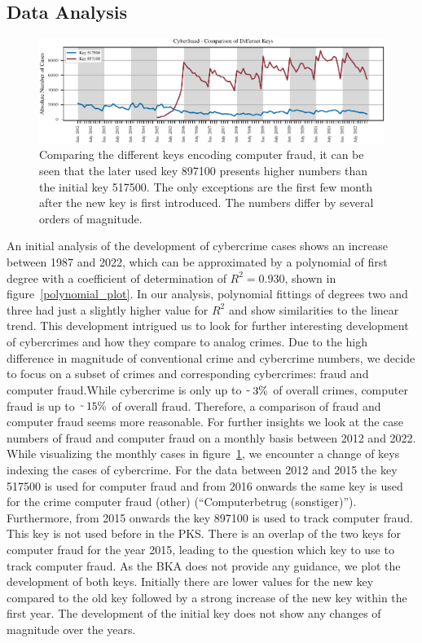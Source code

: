 \documentclass{article}
\theoremstyle{plain}
\theoremstyle{definition}
\theoremstyle{remark}
\begin{document}
\subsection{Data Analysis}
\label{temp_data_analysis}
%
\begin{figure}[btp]
    \includegraphics{fig/computer_fraud_from_diff_keys.pdf}
    \caption{Comparing the different keys encoding computer fraud, it can be seen that the later used key 897100 presents higher numbers than the initial key 517500. The only exceptions are the first few month after the new key is first introduced. The numbers differ by several orders of magnitude.}
    \label{fraud_plot}
\end{figure}
%
An initial analysis of the development of cybercrime cases shows an increase between 1987 and 2022, which can be approximated by a polynomial of first degree with a coefficient of determination of $R^2 = 0.930$, shown in figure~\ref{polynomial_plot}. In our analysis, polynomial fittings of degrees two and three had just a slightly higher value for $R^2$ and show similarities to the linear trend. This development intrigued us to look for further interesting development of cybercrimes and how they compare to analog crimes. Due to the high difference in magnitude of conventional crime and cybercrime numbers, we decide to focus on a subset of crimes and corresponding cybercrimes: fraud and computer fraud.While cybercrime is only up to $\raisebox{-0.7ex}{\~{}}\, 3\%$ of overall crimes, computer fraud is up to $\raisebox{-0.6ex}{\~{}}\, 15\%$ of overall fraud. Therefore, a comparison of fraud and computer fraud seems more reasonable. For further insights we look at the case numbers of fraud and computer fraud on a monthly basis between 2012 and 2022.\\
While visualizing the monthly cases in figure~\ref{fraud_plot}, we encounter a change of keys indexing the cases of cybercrime. For the data between 2012 and 2015 the key 517500 is used for computer fraud and from 2016 onwards the same key is used for the crime computer fraud (other) (\textquotedblleft{}Computerbetrug (sonstiger)\textquotedblright{}). Furthermore, from 2015 onwards the key 897100 is used to track computer fraud. This key is not used before in the PKS. There is an overlap of the two keys for computer fraud for the year 2015, leading to the question which key to use to track computer fraud. As the BKA does not provide any guidance, we plot the development of both keys.
Initially there are lower values for the new key compared to the old key followed by a strong increase of the new key within the first year. The development of the initial key does not show any changes of magnitude over the years.
\end{document}
